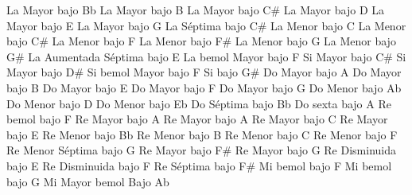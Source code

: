 \small
\upchord{\AAsGuitar}La Mayor bajo Bb \hfill
\upchord{\ABGuitar}La Mayor bajo B \hfill
\upchord{\ACsGuitar}La Mayor bajo C\# \hfill
\upchord{\ADGuitar}La Mayor bajo D \hfill\null\break
\vskip 20pt
\upchord{\AEGuitar}La Mayor bajo E \hfill
\upchord{\AGGuitar}La Mayor bajo G \hfill
\upchord{\AsevenCsGuitar}La S\'eptima bajo C\# \hfill
\upchord{\AmCGuitar}La Menor bajo C \hfill\null\break
\vskip 20pt
\upchord{\AmCsGuitar}La Menor bajo C\# \hfill
\upchord{\AmFGuitar}La Menor bajo F \hfill
\upchord{\AmFsGuitar}La Menor bajo F\# \hfill
\upchord{\AmGGuitar}La Menor bajo G \hfill\null\break
\vskip 20pt
\upchord{\AmGsGuitar}La Menor bajo G\# \hfill
{} \hfill
\upchord{\AaugsevenEGuitar}La Aumentada S\'eptima bajo E \hfill\null\break
\vskip 20pt
\upchord{\AflatFGuitar}La bemol Mayor bajo F \hfill
\upchord{\BCsGuitar}Si Mayor bajo C\# \hfill
\upchord{\BDsGuitar}Si Mayor bajo D\# \hfill\null\break
\vskip 20pt
\upchord{\BflatFGuitar}Si bemol Mayor bajo F \hfill
{} \hfill
{} \hfill
\upchord{\BGsGuitar}Si bajo G\# \hfill\null\break
\vskip 20pt
\upchord{\CAGuitar}Do Mayor bajo A \hfill
\upchord{\CBGuitar}Do Mayor bajo B \hfill
\upchord{\CEGuitar}Do Mayor bajo E \hfill
\upchord{\CFGuitar}Do Mayor bajo F \hfill\null\break
\vskip 20pt
\upchord{\CGGuitar}Do Mayor bajo G \hfill
\upchord{\CmAflatGuitar}Do Menor bajo Ab \hfill
\upchord{\CmDGuitar}Do Menor bajo D \hfill
\upchord{\CmEflatGuitar}Do Menor bajo Eb \hfill\null\break
\vskip 20pt
\upchord{\CsevenBflatGuitar}Do S\'eptima bajo Bb \hfill
\upchord{\CsixAGuitar}Do sexta bajo A \hfill
\upchord{\DflatFGuitar}Re bemol bajo F \hfill
\upchord{\DAGuitar}Re Mayor bajo A \hfill\null\break
\vskip 20pt
\upchord{\DBGuitar}Re Mayor bajo A \hfill
\upchord{\DCGuitar}Re Mayor bajo C \hfill
\upchord{\DEGuitar}Re Mayor bajo E \hfill
\upchord{\DmBflatGuitar}Re Menor bajo Bb \hfill\null\break
\vskip 20pt
\upchord{\DmBGuitar}Re Menor bajo B \hfill
\upchord{\DmCGuitar}Re Menor bajo C \hfill
\upchord{\DmFGuitar}Re Menor bajo F \hfill
\upchord{\DmsevenGGuitar}Re Menor S\'eptima bajo G \hfill\null\break
\vskip 20pt
\upchord{\DFsGuitar}Re Mayor bajo F\# \hfill
\upchord{\DGGuitar}Re Mayor bajo G \hfill
\upchord{\DdimEGuitar}Re Disminuida bajo E \hfill
\upchord{\DdimFGuitar}Re Disminuida bajo F \hfill\null\break
\vskip 20pt
\upchord{\DsevenFsGuitar}Re S\'eptima bajo F\# \hfill
\upchord{\EflatFGuitar}Mi bemol bajo F \hfill
\upchord{\EflatGGuitar}Mi bemol bajo G \hfill\null\break
\vskip 20pt
\upchord{\EAflatGuitar}Mi Mayor bemol Bajo Ab \hfill
